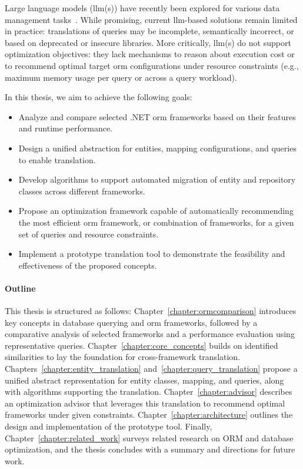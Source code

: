 Large language models (\acrshort{llm}(s)) have recently been explored for various data management tasks~\cite{DBLP:journals/pvldb/FernandezEFKT23,DBLP:journals/vldb/KatsogiannisMeimarakisK23}. While promising, current \acrshort{llm}-based solutions remain limited in practice: translations of queries may be incomplete, semantically incorrect, or based on deprecated or insecure libraries. More critically, \acrshort{llm}(s) do not support optimization objectives: they lack mechanisms to reason about execution cost or to recommend optimal target \acrshort{orm} configurations under resource constraints (e.g., maximum memory usage per query or across a query workload).

In this thesis, we aim to achieve the following goals:
\begin{itemize}
    \item Analyze and compare selected .NET \acrshort{orm} frameworks based on their features and runtime performance.
    \item Design a unified abstraction for entities, mapping configurations, and queries to enable translation.
    \item Develop algorithms to support automated migration of entity and repository classes across different frameworks.
    \item Propose an optimization framework capable of automatically recommending the most efficient \acrshort{orm} framework, or combination of frameworks, for a given set of queries and resource constraints.
    \item Implement a prototype translation tool to demonstrate the feasibility and effectiveness of the proposed concepts.
\end{itemize}

\paragraph{Outline} This thesis is structured as follows: Chapter~\ref{chapter:ormcomparison} introduces key concepts in database querying and \acrshort{orm} frameworks, followed by a comparative analysis of selected frameworks and a performance evaluation using representative queries. Chapter~\ref{chapter:core_concepts} builds on identified similarities to lay the foundation for cross-framework translation. Chapters~\ref{chapter:entity_translation} and~\ref{chapter:query_translation} propose a unified abstract representation for entity classes, mapping, and queries, along with algorithms supporting the translation. Chapter~\ref{chapter:advisor} describes an optimization advisor that leverages this translation to recommend optimal frameworks under given constraints. Chapter~\ref{chapter:architecture} outlines the design and implementation of the prototype tool. Finally, Chapter~\ref{chapter:related_work} surveys related research on ORM and database optimization, and the thesis concludes with a summary and directions for future work.
